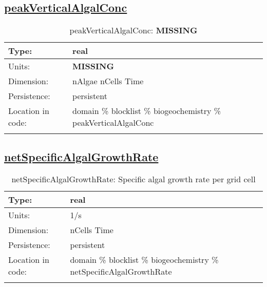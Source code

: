 \subsection[peakVerticalAlgalConc]{\hyperref[sec:var_tab_biogeochemistry]{peakVerticalAlgalConc}}
\label{subsec:var_sec_biogeochemistry_peakVerticalAlgalConc}
\begin{center}
\begin{longtable}{| p{2.0in} | p{4.0in} |}
        \hline 
        Type: & real \\
        \hline 
        Units: & {\bf \color{red} MISSING} \\
        \hline 
        Dimension: & nAlgae nCells Time \\
        \hline 
        Persistence: & persistent \\
        \hline 
         Location in code: & domain \% blocklist \% biogeochemistry \% peakVerticalAlgalConc \\
         \hline 
    \caption{peakVerticalAlgalConc: {\bf \color{red} MISSING}}
\end{longtable}
\end{center}
\subsection[netSpecificAlgalGrowthRate]{\hyperref[sec:var_tab_biogeochemistry]{netSpecificAlgalGrowthRate}}
\label{subsec:var_sec_biogeochemistry_netSpecificAlgalGrowthRate}
\begin{center}
\begin{longtable}{| p{2.0in} | p{4.0in} |}
        \hline 
        Type: & real \\
        \hline 
        Units: & \si{1/s} \\
        \hline 
        Dimension: & nCells Time \\
        \hline 
        Persistence: & persistent \\
        \hline 
         Location in code: & domain \% blocklist \% biogeochemistry \% netSpecificAlgalGrowthRate \\
         \hline 
    \caption{netSpecificAlgalGrowthRate: Specific algal growth rate per grid cell}
\end{longtable}
\end{center}
